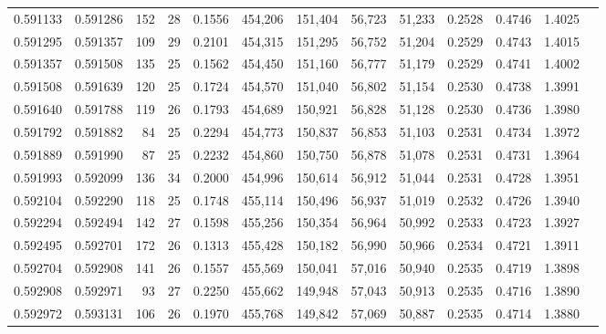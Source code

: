 \begin{tabular}{rrrrrrrrrrrrr}
0.591133 & 0.591286 &   152 &  28 &                                     0.1556 & 454,206 & 151,404 &  56,723 &  51,233 & 0.2528 & 0.4746 & 1.4025 \\
0.591295 & 0.591357 &   109 &  29 &                                     0.2101 & 454,315 & 151,295 &  56,752 &  51,204 & 0.2529 & 0.4743 & 1.4015 \\
0.591357 & 0.591508 &   135 &  25 &                                     0.1562 & 454,450 & 151,160 &  56,777 &  51,179 & 0.2529 & 0.4741 & 1.4002 \\
0.591508 & 0.591639 &   120 &  25 &                                     0.1724 & 454,570 & 151,040 &  56,802 &  51,154 & 0.2530 & 0.4738 & 1.3991 \\
0.591640 & 0.591788 &   119 &  26 &                                     0.1793 & 454,689 & 150,921 &  56,828 &  51,128 & 0.2530 & 0.4736 & 1.3980 \\
0.591792 & 0.591882 &    84 &  25 &                                     0.2294 & 454,773 & 150,837 &  56,853 &  51,103 & 0.2531 & 0.4734 & 1.3972 \\
0.591889 & 0.591990 &    87 &  25 &                                     0.2232 & 454,860 & 150,750 &  56,878 &  51,078 & 0.2531 & 0.4731 & 1.3964 \\
0.591993 & 0.592099 &   136 &  34 &                                     0.2000 & 454,996 & 150,614 &  56,912 &  51,044 & 0.2531 & 0.4728 & 1.3951 \\
0.592104 & 0.592290 &   118 &  25 &                                     0.1748 & 455,114 & 150,496 &  56,937 &  51,019 & 0.2532 & 0.4726 & 1.3940 \\
0.592294 & 0.592494 &   142 &  27 &                                     0.1598 & 455,256 & 150,354 &  56,964 &  50,992 & 0.2533 & 0.4723 & 1.3927 \\
0.592495 & 0.592701 &   172 &  26 &                                     0.1313 & 455,428 & 150,182 &  56,990 &  50,966 & 0.2534 & 0.4721 & 1.3911 \\
0.592704 & 0.592908 &   141 &  26 &                                     0.1557 & 455,569 & 150,041 &  57,016 &  50,940 & 0.2535 & 0.4719 & 1.3898 \\
0.592908 & 0.592971 &    93 &  27 &                                     0.2250 & 455,662 & 149,948 &  57,043 &  50,913 & 0.2535 & 0.4716 & 1.3890 \\
0.592972 & 0.593131 &   106 &  26 &                                     0.1970 & 455,768 & 149,842 &  57,069 &  50,887 & 0.2535 & 0.4714 & 1.3880 \\

\end{tabular}
